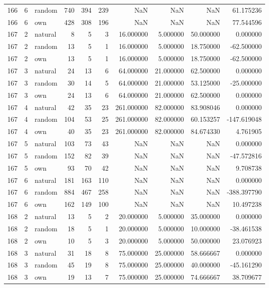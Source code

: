 \begin{table}[htbp]
\begin{tabular}{rrlrrrrrrr}
166 & 6 & random & 740 & 394 & 239 & NaN & NaN & NaN & 61.175236 \\
166 & 6 & own & 428 & 308 & 196 & NaN & NaN & NaN & 77.544596 \\
167 & 2 & natural & 8 & 5 & 3 & 16.000000 & 5.000000 & 50.000000 & 0.000000 \\
167 & 2 & random & 13 & 5 & 1 & 16.000000 & 5.000000 & 18.750000 & -62.500000 \\
167 & 2 & own & 13 & 5 & 1 & 16.000000 & 5.000000 & 18.750000 & -62.500000 \\
167 & 3 & natural & 24 & 13 & 6 & 64.000000 & 21.000000 & 62.500000 & 0.000000 \\
167 & 3 & random & 30 & 14 & 5 & 64.000000 & 21.000000 & 53.125000 & -25.000000 \\
167 & 3 & own & 24 & 13 & 6 & 64.000000 & 21.000000 & 62.500000 & 0.000000 \\
167 & 4 & natural & 42 & 35 & 23 & 261.000000 & 82.000000 & 83.908046 & 0.000000 \\
167 & 4 & random & 104 & 53 & 25 & 261.000000 & 82.000000 & 60.153257 & -147.619048 \\
167 & 4 & own & 40 & 35 & 23 & 261.000000 & 82.000000 & 84.674330 & 4.761905 \\
167 & 5 & natural & 103 & 73 & 43 & NaN & NaN & NaN & 0.000000 \\
167 & 5 & random & 152 & 82 & 39 & NaN & NaN & NaN & -47.572816 \\
167 & 5 & own & 93 & 70 & 42 & NaN & NaN & NaN & 9.708738 \\
167 & 6 & natural & 181 & 163 & 110 & NaN & NaN & NaN & 0.000000 \\
167 & 6 & random & 884 & 467 & 258 & NaN & NaN & NaN & -388.397790 \\
167 & 6 & own & 162 & 149 & 100 & NaN & NaN & NaN & 10.497238 \\
168 & 2 & natural & 13 & 5 & 2 & 20.000000 & 5.000000 & 35.000000 & 0.000000 \\
168 & 2 & random & 18 & 5 & 1 & 20.000000 & 5.000000 & 10.000000 & -38.461538 \\
168 & 2 & own & 10 & 5 & 3 & 20.000000 & 5.000000 & 50.000000 & 23.076923 \\
168 & 3 & natural & 31 & 18 & 8 & 75.000000 & 25.000000 & 58.666667 & 0.000000 \\
168 & 3 & random & 45 & 19 & 8 & 75.000000 & 25.000000 & 40.000000 & -45.161290 \\
168 & 3 & own & 19 & 13 & 7 & 75.000000 & 25.000000 & 74.666667 & 38.709677 \\

\end{tabular}
\end{table}
